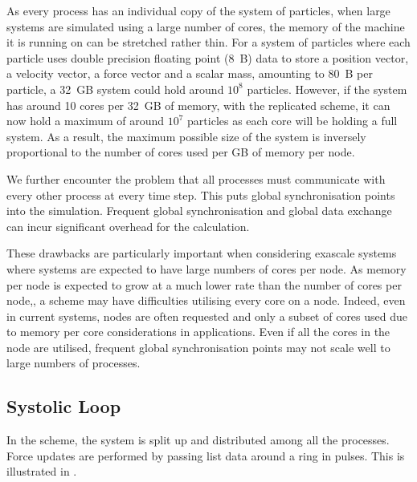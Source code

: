 As every process has an individual copy of the system of particles,
when large systems are simulated using a large number of cores,
the memory of the machine it is running on can be stretched rather thin.
%
For a system of particles where each particle uses double
precision floating point (8~B) data to store
a position vector,
a velocity vector,
a force vector and
a scalar mass,
amounting to 80~B per particle, a 32~GB system could hold around $10^8$
particles.
%
However, if the system has around 10 cores per 32~GB of memory,
with the replicated scheme,
it can now hold a maximum of around $10^7$ particles
as each core will be holding a full system.
%
As a result, the maximum possible size of the system is
inversely proportional to
the number of cores used per GB of memory per node.

We further encounter the problem that all processes must communicate
with every other process at every time step.
%
This puts global synchronisation points into the simulation.
%
Frequent global synchronisation and global data exchange can incur
significant overhead for the calculation.

%
These drawbacks are particularly important when considering exascale systems
where systems are expected to have large numbers of cores per node.
%
As memory per node is expected to grow at a much lower rate than
the number of cores per node,,
a \replicateddata{} scheme may have difficulties
utilising every core on a node.
%
Indeed, even in current systems, nodes are often requested and only a
subset of cores used due to memory per core considerations in applications.
%
Even if all the cores in the node are utilised, frequent global synchronisation
points may not scale well to large numbers of processes.



\subsection{Systolic Loop}
\label{sec:background:subsec:systolic_loop}

%
In the \systolicloop{} scheme, the system is split up and distributed among
all the processes.
%
Force updates are performed by passing list data around a ring in pulses.
%
This is illustrated in .

